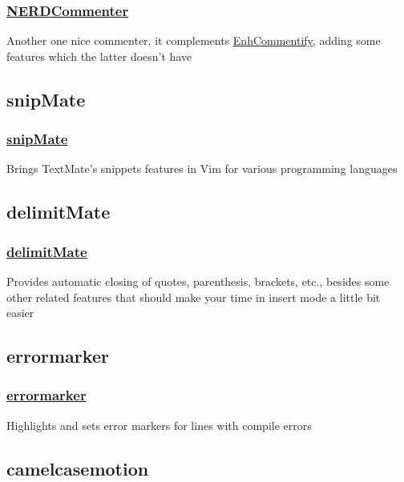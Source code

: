 \documentclass[14pt,svgnames,compress]{beamer}
\newcommand\hl[1]{\textcolor{HlColor}{#1}}
\begin{document}
\begin{frame}
    \frametitle{
        \href{https://github.com/vim-scripts/The-NERD-Commenter}
             {NERDCommenter}
    }
    \large
    Another one nice commenter, it complements
    \href{https://github.com/vim-scripts/EnhCommentify.vim}{EnhCommentify},
    adding some features which the latter doesn't have \\
\end{frame}


\subsection{snipMate}

\begin{frame}
    \frametitle{
        \href{git://github.com/msanders/snipmate.vim.git}
             {snipMate}
    }
    \large
    Brings \hl{TextMate}'s snippets features in Vim for various programming
    languages \\
\end{frame}


\subsection{delimitMate}

\begin{frame}
    \frametitle{
        \href{git://github.com/Raimondi/delimitMate.git}
             {delimitMate}
    }
    \large
    Provides automatic closing of quotes, parenthesis, brackets, etc., besides
    some other related features that should make your time in insert mode a
    little bit easier \\
\end{frame}


\subsection{errormarker}

\begin{frame}
    \frametitle{
        \href{https://github.com/vim-scripts/errormarker.vim}
             {errormarker}
    }
    \large
    Highlights and sets error markers for lines with compile errors
\end{frame}


\subsection{camelcasemotion}
\end{document}
